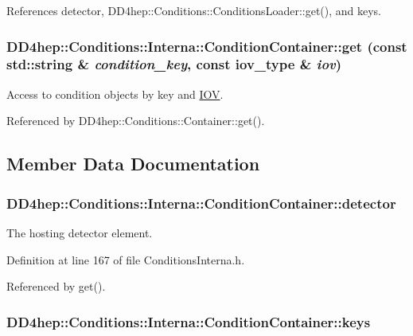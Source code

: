 References detector, DD4hep::Conditions::ConditionsLoader::get(), and keys.\hypertarget{class_d_d4hep_1_1_conditions_1_1_interna_1_1_condition_container_a27dc131c286e1e4be01223d446842e4f}{
\subsubsection[{get}]{ DD4hep::Conditions::Interna::ConditionContainer::get (const std::string \& {\em condition\_\-key}, \/  const {\bf iov\_\-type} \& {\em iov})}}
\label{class_d_d4hep_1_1_conditions_1_1_interna_1_1_condition_container_a27dc131c286e1e4be01223d446842e4f}


Access to condition objects by key and \hyperlink{class_d_d4hep_1_1_i_o_v}{IOV}. 

Referenced by DD4hep::Conditions::Container::get().

\subsection{Member Data Documentation}
\hypertarget{class_d_d4hep_1_1_conditions_1_1_interna_1_1_condition_container_aea33e2b2bf7d2ee4db38f87d2f231a2e}{
\subsubsection[{detector}]{ {\bf DD4hep::Conditions::Interna::ConditionContainer::detector}}}
\label{class_d_d4hep_1_1_conditions_1_1_interna_1_1_condition_container_aea33e2b2bf7d2ee4db38f87d2f231a2e}


The hosting detector element. 

Definition at line 167 of file ConditionsInterna.h.

Referenced by get().\hypertarget{class_d_d4hep_1_1_conditions_1_1_interna_1_1_condition_container_a80876b929c712092fb1e036e1916f621}{
\subsubsection[{keys}]{ {\bf DD4hep::Conditions::Interna::ConditionContainer::keys}}}
\label{class_d_d4hep_1_1_conditions_1_1_interna_1_1_condition_container_a80876b929c712092fb1e036e1916f621}


